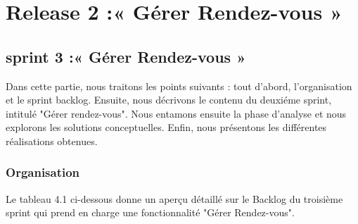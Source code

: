 
\chapter{Release 2 :« Gérer Rendez-vous » }
\label{chap_sprint3}

\section*{sprint 3 :« Gérer Rendez-vous » }
 Dans cette partie, nous traitons les points suivants : tout d'abord, l'organisation et le sprint backlog. Ensuite, nous décrivons le contenu du deuxiéme sprint, intitulé "Gérer rendez-vous". Nous entamons ensuite la phase d'analyse et nous explorons les solutions conceptuelles. Enfin, nous présentons les différentes réalisations obtenues.
\subsection{Organisation}
Le tableau 4.1 ci-dessous donne un aperçu détaillé sur le Backlog du troisième sprint qui
prend en charge une fonctionnalité "Gérer Rendez-vous".
\\

